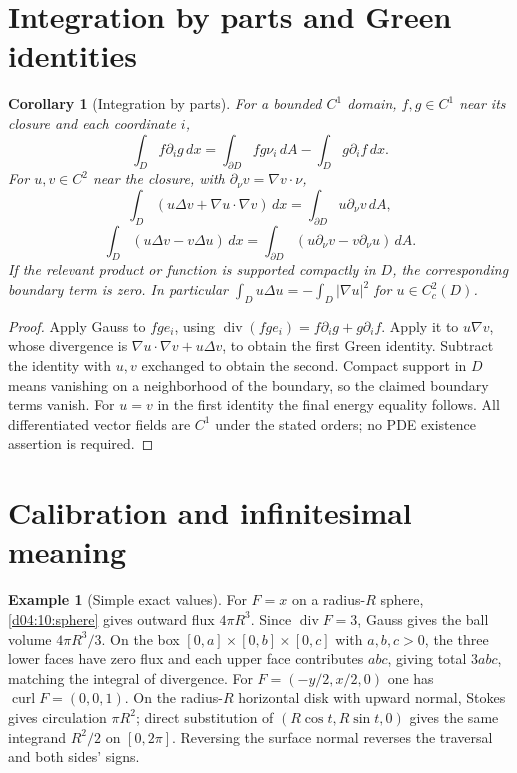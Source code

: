 \documentclass[11pt,oneside,openany]{book}
\newtheorem{corollary}[theorem]{Corollary}
\theoremstyle{definition}
\newtheorem{example}[theorem]{Example}
\theoremstyle{remark}
\newcommand{\family}[1]{}
\begin{document}
\section{Integration by parts and Green identities}
\family{K04.12.07}\family{K04.12.08}
\begin{corollary}[Integration by parts]\label{d04:12:parts}
For a bounded $C^1$ domain, $f,g\in C^1$ near its closure and each coordinate
$i$,
\[
 \int_Df\partial_i g\,dx
 =\int_{\partial D}fg\nu_i\,dA-\int_Dg\partial_i f\,dx.
\]
For $u,v\in C^2$ near the closure, with
$\partial_\nu v=\nabla v\cdot\nu$,
\[
 \int_D(u\Delta v+\nabla u\cdot\nabla v)\,dx
 =\int_{\partial D}u\partial_\nu v\,dA,
\]
\[
 \int_D(u\Delta v-v\Delta u)\,dx
 =\int_{\partial D}(u\partial_\nu v-v\partial_\nu u)\,dA.
\]
If the relevant product or function is supported compactly in $D$, the
corresponding boundary term is zero. In particular
$\int_Du\Delta u=-\int_D|\nabla u|^2$ for $u\in C_c^2(D)$.
\end{corollary}
\begin{proof}
Apply Gauss to $fg e_i$, using
$\operatorname{div}(fg e_i)=f\partial_i g+g\partial_i f$.
Apply it to $u\nabla v$, whose divergence is
$\nabla u\cdot\nabla v+u\Delta v$, to obtain the first Green identity.
Subtract the identity with $u,v$ exchanged to obtain the second. Compact
support in $D$ means vanishing on a neighborhood of the boundary, so the
claimed boundary terms vanish. For $u=v$ in the first identity the final
energy equality follows. All differentiated vector fields are $C^1$ under
the stated orders; no PDE existence assertion is required.
\end{proof}

\section{Calibration and infinitesimal meaning}
\family{K04.12.09}
\begin{example}[Simple exact values]\label{d04:12:calibration}
For $F=x$ on a radius-$R$ sphere, \cref{d04:10:sphere} gives outward flux
$4\pi R^3$. Since $\operatorname{div}F=3$, Gauss gives the ball volume
$4\pi R^3/3$. On the box $[0,a]\times[0,b]\times[0,c]$ with $a,b,c>0$, the three lower
faces have zero flux and each upper face contributes $abc$, giving total
$3abc$, matching the integral of divergence. For
$F=(-y/2,x/2,0)$ one has $\operatorname{curl}F=(0,0,1)$.
On the radius-$R$ horizontal disk with upward normal, Stokes gives
circulation $\pi R^2$; direct substitution of
$(R\cos t,R\sin t,0)$ gives the same integrand $R^2/2$ on $[0,2\pi]$.
Reversing the surface normal reverses the traversal and both sides' signs.
\end{example}
\end{document}
